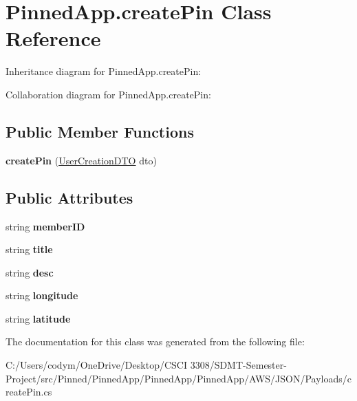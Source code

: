 \hypertarget{class_pinned_app_1_1create_pin}{}\section{Pinned\+App.\+create\+Pin Class Reference}
\label{class_pinned_app_1_1create_pin}


Inheritance diagram for Pinned\+App.\+create\+Pin\+:


Collaboration diagram for Pinned\+App.\+create\+Pin\+:
\subsection*{Public Member Functions}
\begin{DoxyCompactItemize}
\item 
\mbox{\label{class_pinned_app_1_1create_pin_a8d88f044a2855682321e0abb68bb8436}} 
{\bfseries create\+Pin} (\hyperlink{class_pinned_app_1_1_user_creation_d_t_o}{User\+Creation\+D\+TO} dto)
\end{DoxyCompactItemize}
\subsection*{Public Attributes}
\begin{DoxyCompactItemize}
\item 
\mbox{\label{class_pinned_app_1_1create_pin_ab911b43a22845b5c99866c4fd1efc6d9}} 
string {\bfseries member\+ID}
\item 
\mbox{\label{class_pinned_app_1_1create_pin_aef9addc53645835d1c55fcbe6bb8d19a}} 
string {\bfseries title}
\item 
\mbox{\label{class_pinned_app_1_1create_pin_a92b6124213d9233df92a44906460e255}} 
string {\bfseries desc}
\item 
\mbox{\label{class_pinned_app_1_1create_pin_a0f3a28a21cdbd5d453a6680dfc0c0402}} 
string {\bfseries longitude}
\item 
\mbox{\label{class_pinned_app_1_1create_pin_ad7b09c401b6e33a5e560e2e0778f9109}} 
string {\bfseries latitude}
\end{DoxyCompactItemize}


The documentation for this class was generated from the following file\+:\begin{DoxyCompactItemize}
\item 
C\+:/\+Users/codym/\+One\+Drive/\+Desktop/\+C\+S\+C\+I 3308/\+S\+D\+M\+T-\/\+Semester-\/\+Project/src/\+Pinned/\+Pinned\+App/\+Pinned\+App/\+Pinned\+App/\+A\+W\+S/\+J\+S\+O\+N/\+Payloads/create\+Pin.\+cs\end{DoxyCompactItemize}

